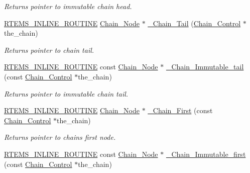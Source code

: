 \begin{DoxyCompactItemize}
\begin{DoxyCompactList}\small\item\em Returns pointer to immutable chain head. \end{DoxyCompactList}\item 
\mbox{\hyperlink{group__RTEMSScoreBaseDefs_gac216239df231d5dbd15e3520b0b9313f}{R\+T\+E\+M\+S\+\_\+\+I\+N\+L\+I\+N\+E\+\_\+\+R\+O\+U\+T\+I\+NE}} \mbox{\hyperlink{group__RTEMSScoreChain_ga0dd4bfcca1ac7f90de2842e447846d3d}{Chain\+\_\+\+Node}} $\ast$ \mbox{\hyperlink{group__RTEMSScoreChain_ga06f3e2dd6d64411f0565e3b483e53673}{\+\_\+\+Chain\+\_\+\+Tail}} (\mbox{\hyperlink{unionChain__Control}{Chain\+\_\+\+Control}} $\ast$the\+\_\+chain)
\begin{DoxyCompactList}\small\item\em Returns pointer to chain tail. \end{DoxyCompactList}\item 
\mbox{\hyperlink{group__RTEMSScoreBaseDefs_gac216239df231d5dbd15e3520b0b9313f}{R\+T\+E\+M\+S\+\_\+\+I\+N\+L\+I\+N\+E\+\_\+\+R\+O\+U\+T\+I\+NE}} const \mbox{\hyperlink{group__RTEMSScoreChain_ga0dd4bfcca1ac7f90de2842e447846d3d}{Chain\+\_\+\+Node}} $\ast$ \mbox{\hyperlink{group__RTEMSScoreChain_ga2dad341ef33d4fdcd23ce2b30d8c1c9c}{\+\_\+\+Chain\+\_\+\+Immutable\+\_\+tail}} (const \mbox{\hyperlink{unionChain__Control}{Chain\+\_\+\+Control}} $\ast$the\+\_\+chain)
\begin{DoxyCompactList}\small\item\em Returns pointer to immutable chain tail. \end{DoxyCompactList}\item 
\mbox{\hyperlink{group__RTEMSScoreBaseDefs_gac216239df231d5dbd15e3520b0b9313f}{R\+T\+E\+M\+S\+\_\+\+I\+N\+L\+I\+N\+E\+\_\+\+R\+O\+U\+T\+I\+NE}} \mbox{\hyperlink{group__RTEMSScoreChain_ga0dd4bfcca1ac7f90de2842e447846d3d}{Chain\+\_\+\+Node}} $\ast$ \mbox{\hyperlink{group__RTEMSScoreChain_ga89304b2d294b98f4909dcb6e68d7ec82}{\+\_\+\+Chain\+\_\+\+First}} (const \mbox{\hyperlink{unionChain__Control}{Chain\+\_\+\+Control}} $\ast$the\+\_\+chain)
\begin{DoxyCompactList}\small\item\em Returns pointer to chain\textquotesingle{}s first node. \end{DoxyCompactList}\item 
\mbox{\hyperlink{group__RTEMSScoreBaseDefs_gac216239df231d5dbd15e3520b0b9313f}{R\+T\+E\+M\+S\+\_\+\+I\+N\+L\+I\+N\+E\+\_\+\+R\+O\+U\+T\+I\+NE}} const \mbox{\hyperlink{group__RTEMSScoreChain_ga0dd4bfcca1ac7f90de2842e447846d3d}{Chain\+\_\+\+Node}} $\ast$ \mbox{\hyperlink{group__RTEMSScoreChain_gaafac27cae9babb0434c0c4253e9bcc25}{\+\_\+\+Chain\+\_\+\+Immutable\+\_\+first}} (const \mbox{\hyperlink{unionChain__Control}{Chain\+\_\+\+Control}} $\ast$the\+\_\+chain)

\end{DoxyCompactItemize}
